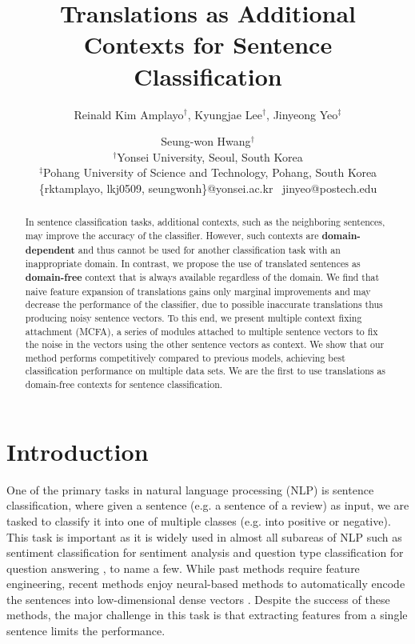 \documentclass{article}
\title{Translations as Additional Contexts for Sentence Classification}
\author{Reinald Kim Amplayo$^\dag${,}
  Kyungjae Lee$^\dag${,}
  Jinyeong Yeo$^\ddag$ \and
  Seung-won Hwang$^\dag$ \\
  $^\dag$Yonsei University, Seoul, South Korea \\
  $^\ddag$Pohang University of Science and Technology, Pohang, South Korea \\
  {\{rktamplayo, lkj0509, seungwonh\}@yonsei.ac.kr~	
  jinyeo@postech.edu} \\
}
\begin{document}
\maketitle
\begin{abstract}
In sentence classification tasks, additional contexts, such as the neighboring sentences, may improve the accuracy of the classifier.
However, such contexts are {\bf domain-dependent} and thus cannot be used for another classification task with an inappropriate domain.
In contrast, we propose the use of translated sentences
as {\bf domain-free} context 
that is always available regardless of the domain.
We find that naive feature expansion of translations gains only marginal improvements and may decrease the performance of the classifier, due to possible inaccurate translations thus producing noisy sentence vectors.
To this end, we present 
multiple context fixing attachment (MCFA), a series of modules attached to multiple sentence vectors to fix the noise in the vectors using the other sentence vectors as context. 
We show that our method performs competitively compared to previous
models, achieving best classification performance on multiple data sets.
We are the first to use translations as domain-free contexts for sentence classification.
\end{abstract}

\setlength{\parskip}{0pt}
\setlength{\abovedisplayskip}{0pt}\setlength{\belowdisplayskip}{0pt}\setlength{\abovedisplayshortskip}{0pt}\setlength{\belowdisplayshortskip}{0pt}\setlength{\jot}{0pt}
\setlength{\textfloatsep}{10pt}

\renewcommand{\footnotesize}{\normalsize}

\makeatletter
\renewcommand\paragraph{\@startsection{paragraph}{4}{\z@}{\parskip}{-1em}{\normalfont\normalsize\bfseries}}

\section{Introduction}\label{sec:intro}

One of the primary tasks in natural language processing (NLP) is sentence classification, where given a sentence (e.g. a sentence of a review) as input, we are tasked to classify it into one of multiple classes (e.g. into positive or negative). This task is important as it is widely used in almost all subareas of NLP such as sentiment classification for sentiment analysis \cite{Pang2007OpinionMA} and question type classification for question answering \cite{li2002learning}, to name a few. While past methods require feature engineering, recent methods enjoy neural-based methods to automatically encode the sentences into low-dimensional dense vectors \cite{Kim2014ConvolutionalNN,Joulin2017BagOT}. 
Despite the success of these methods, the major challenge in this task is that extracting features from a single sentence limits the performance.
\end{document}
